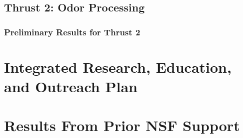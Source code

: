 \documentclass[11 pt]{article}
\begin{document}
\subsection{Thrust 2: Odor Processing}
\label{sec:tract2}
\label{ssec:research2}


\subsubsection{Preliminary Results for Thrust 2}
\label{ssec:prelim2}


\section{Integrated Research, Education, and Outreach Plan}
\label{sec:irep}


\section{Results From Prior NSF Support}
\label{sec:prior_nsf}

\end{document}
